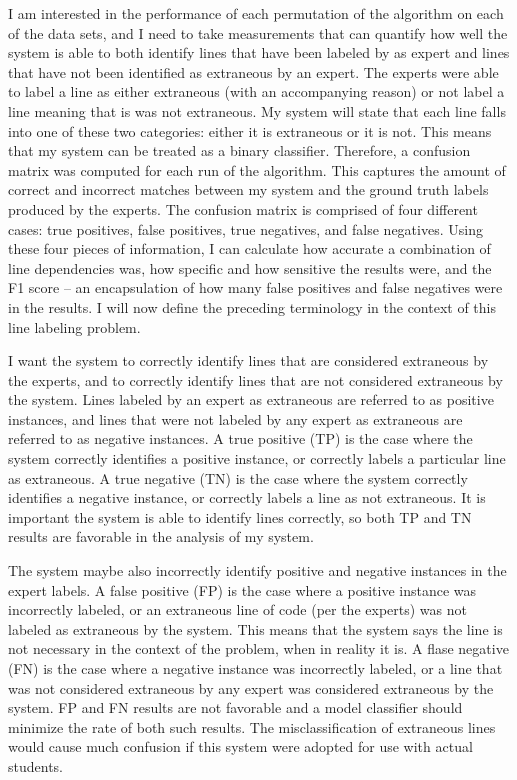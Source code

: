 \documentclass[draft]{article}
\begin{document}
I am interested in the performance of each permutation of the algorithm on each of the data sets, and I need to take measurements that can quantify how well the system is able to both identify lines that have been labeled by as expert and lines that have not been identified as extraneous by an expert. The experts were able to label a line as either extraneous (with an accompanying reason) or not label a line meaning that is was not extraneous. My system will state that each line falls into one of these two categories: either it is extraneous or it is not. This means that my system can be treated as a binary classifier. Therefore, a confusion matrix was computed for each run of the algorithm. This captures the amount of correct and incorrect matches between my system and the ground truth labels produced by the experts. The confusion matrix is comprised of four different cases: true positives, false positives, true negatives, and false negatives. Using these four pieces of information, I can calculate how accurate a combination of line dependencies was, how specific and how sensitive the results were, and the F1 score -- an encapsulation of how many false positives and false negatives were in the results. I will now define the preceding terminology in the context of this line labeling problem.

I want the system to correctly identify lines that are considered extraneous by the experts, and to correctly identify lines that are not considered extraneous by the system. Lines labeled by an expert as extraneous are referred to as positive instances, and lines that were not labeled by any expert as extraneous are referred to as negative instances. A true positive (TP) is the case where the system correctly identifies a positive instance, or correctly labels a particular line as extraneous. A true negative (TN) is the case where the system correctly identifies a negative instance, or correctly labels a line as not extraneous. It is important the system is able to identify lines correctly, so both TP and TN results are favorable in the analysis of my system.

The system maybe also incorrectly identify positive and negative instances in the expert labels. A false positive (FP) is the case where a positive instance was incorrectly labeled, or an extraneous line of code (per the experts) was not labeled as extraneous by the system. This means that the system says the line is not necessary in the context of the problem, when in reality it is. A flase negative (FN) is the case where a negative instance was incorrectly labeled, or a line that was not considered extraneous by any expert was considered extraneous by the system. FP and FN results are not favorable and a model classifier should minimize the rate of both such results. The misclassification of extraneous lines would cause much confusion if this system were adopted for use with actual students.
\end{document}
